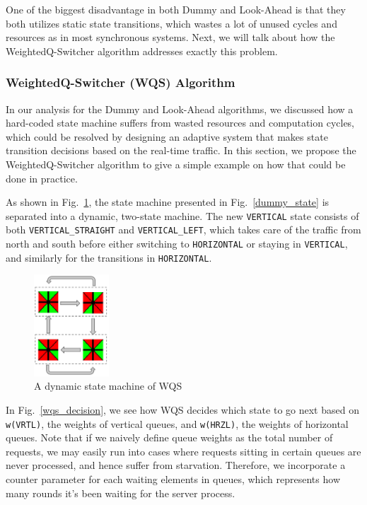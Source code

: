 \documentclass[conference]{IEEEtran}
\begin{document}
One of the biggest disadvantage in both Dummy and Look-Ahead is that they both utilizes static state transitions, which wastes a lot of unused cycles and resources as in most synchronous systems. Next, we will talk about how the WeightedQ-Switcher algorithm addresses exactly this problem.

\subsubsection{WeightedQ-Switcher (WQS) Algorithm}

In our analysis for the Dummy and Look-Ahead algorithms, we discussed how a hard-coded state machine suffers from wasted resources and computation cycles, which could be resolved by designing an adaptive system that makes state transition decisions based on the real-time traffic. In this section, we propose the WeightedQ-Switcher algorithm to give a simple example on how that could be done in practice.

As shown in Fig.~\ref{wqs_state}, the state machine presented in Fig.~\ref{dummy_state} is separated into a dynamic, two-state machine. The new \texttt{VERTICAL} state consists of both \texttt{VERTICAL\_STRAIGHT} and \texttt{VERTICAL\_LEFT}, which takes care of the traffic from north and south before either switching to \texttt{HORIZONTAL} or staying in \texttt{VERTICAL}, and similarly for the transitions in \texttt{HORIZONTAL}.

\begin{figure}[h]
    \center    
    \includegraphics[width=0.25\textwidth]{images/wqs_state.png}
	\caption{A dynamic state machine of WQS}
	\label{wqs_state}
\end{figure}

In Fig.~\ref{wqs_decision}, we see how WQS decides which state to go next based on \texttt{w(VRTL)}, the weights of vertical queues, and \texttt{w(HRZL)}, the weights of horizontal queues. Note that if we naively define queue weights as the total number of requests, we may easily run into cases where requests sitting in certain queues are never processed, and hence suffer from starvation. Therefore, we incorporate a counter parameter for each waiting elements in queues, which represents how many rounds it's been waiting for the server process. 
\end{document}
